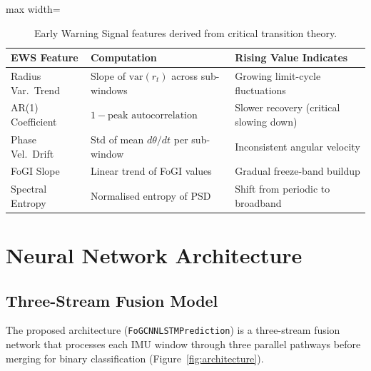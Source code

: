\documentclass[12pt,a4paper,oneside]{report}
\numberwithin{equation}{chapter}
\numberwithin{figure}{chapter}
\numberwithin{table}{chapter}
\begin{document}
\begin{table}[ht]
\centering
\caption{Early Warning Signal features derived from critical transition theory.}
\label{tab:ews_features}
\renewcommand{\arraystretch}{1.3}
\begin{adjustbox}{max width=\textwidth}
\begin{tabular}{p{3.5cm} p{5cm} p{5.5cm}}
\toprule
\textbf{EWS Feature} & \textbf{Computation} & \textbf{Rising Value Indicates} \\
\midrule
Radius Var.\ Trend & Slope of $\text{var}(r_t)$ across sub-windows & Growing limit-cycle fluctuations \\
AR(1) Coefficient & $1 - \text{peak autocorrelation}$ & Slower recovery (critical slowing down) \\
Phase Vel.\ Drift & Std of mean $d\theta/dt$ per sub-window & Inconsistent angular velocity \\
FoGI Slope & Linear trend of FoGI values & Gradual freeze-band buildup \\
Spectral Entropy & Normalised entropy of PSD & Shift from periodic to broadband \\
\bottomrule
\end{tabular}
\end{adjustbox}
\end{table}

\section{Neural Network Architecture}

\subsection{Three-Stream Fusion Model}

The proposed architecture (\texttt{FoGCNNLSTMPrediction}) is a three-stream fusion network that processes each IMU window through three parallel pathways before merging for binary classification (Figure~\ref{fig:architecture}).
\end{document}
